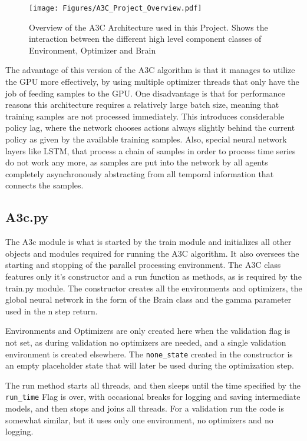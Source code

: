  \begin{figure}[htb]
  \centering
      \texttt{[image: Figures/A3C\_Project\_Overview.pdf]}
  \caption{ Overview of the A3C Architecture used in this Project. Shows the interaction between the different high level component classes of Environment, Optimizer and Brain}
 \label{fig:a3c_over}
\end{figure}

The advantage of this version of the A3C algorithm is that it manages to utilize the GPU more effectively, by using multiple optimizer threads that only have the job of feeding samples to the GPU. One disadvantage is that for performance reasons this architecture requires a relatively large batch size, meaning that training samples are not processed immediately. This introduces considerable policy lag, where the network chooses actions always slightly behind the current policy as given by the available training samples. Also, special neural network layers like LSTM, that process a chain of samples in order to process time series do not work any more, as samples are put into the network by all agents completely asynchronously abstracting from all temporal information that connects the samples.

\subsection{A3c.py}
The A3c module is what is started by the train module and initializes all other objects and modules required for running the A3C algorithm. It also oversees the starting and stopping of the parallel processing environment. The A3C class features only it's constructor and a run function as methods, as is required by the train.py module.
The constructor creates all the environments and optimizers, the global neural network in the form of the Brain class and the gamma parameter used in the n step return.

Environments and Optimizers are only created here when the validation flag is not set, as during validation no optimizers are needed, and a single validation environment is created elsewhere.
The \lstinline{none_state} created in the constructor is an empty placeholder state that will later be used during the optimization step.

The run method starts all threads, and then sleeps until the time specified by the \lstinline{run_time} Flag is over, with occasional breaks for logging and saving intermediate models, and then stops and joins all threads.
For a validation run the code is somewhat similar, but it uses only one environment, no optimizers and no logging.

